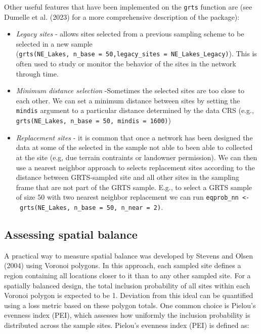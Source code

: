 \documentclass[
  letterpaper,
  DIV=11,
  numbers=noendperiod]{scrartcl}
\begin{document}
Other useful features that have been implemented on the \texttt{grts}
function are (see Dumelle et al. (2023) for a more comprehensive
description of the package):

\begin{itemize}
\item
  \emph{Legacy sites} - allows sites selected from a previous sampling
  scheme to be selected in a new sample
  (\texttt{grts(NE\_Lakes,\ n\_base\ =\ 50,legacy\_sites\ =\ NE\_Lakes\_Legacy)}).
  This is often used to study or monitor the behavior of the sites in
  the network through time.
\item
  \emph{Minimum distance selection} -Sometimes the selected sites are
  too close to each other. We can set a minimum distance between sites
  by setting the \texttt{mindis} argument to a particular distance
  determined by the data CRS (e.g.,
  \texttt{grts(NE\_Lakes,\ n\_base\ =\ 50,\ mindis\ =\ 1600)})
\item
  \emph{Replacement sites} - it is common that once a network has been
  designed the data at some of the selected in the sample not able to
  been able to collected at the site (e.g, due terrain contraints or
  landowner permission). We can then use a nearest neighbor approach to
  selects replacement sites according to the distance between
  GRTS-sampled site and all other sites in the sampling frame that are
  not part of the GRTS sample. E.g., to select a GRTS sample of size 50
  with two nearest neighbor replacement we can run
  \texttt{eqprob\_nn\ \textless{}-\ grts(NE\_Lakes,\ n\_base\ =\ 50,\ n\_near\ =\ 2)}.
\end{itemize}

\subsection{Assessing spatial balance}\label{assessing-spatial-balance}

A practical way to measure spatial balance was developed by Stevens and
Olsen (2004) using Voronoi polygons. In this approach, each sampled site
defines a region containing all locations closer to it than to any other
sampled site. For a spatially balanced design, the total inclusion
probability of all sites within each Voronoi polygon is expected to be
1. Deviation from this ideal can be quantified using a loss metric based
on these polygon totals. One common choice is Pielou's evenness index
(PEI), which assesses how uniformly the inclusion probability is
distributed across the sample sites. Pielou's evenness index (PEI) is
defined as:
\end{document}
